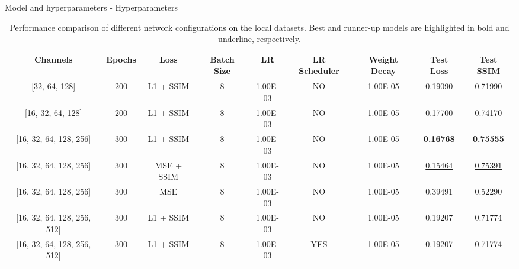\documentclass[8pt]{beamer}
\begin{document}
\begin{frame}{Model and hyperparameters - Hyperparameters}
    \begin{table}[ht]
        \centering
        \small
        \scriptsize
        \begin{tabular}{|c|c|c|c|c|c|c|c|c|}
        \hline
        \textbf{Channels} & \textbf{Epochs} & \textbf{Loss} & \textbf{Batch Size} & \textbf{LR} & \textbf{LR Scheduler} & \textbf{Weight Decay} & \textbf{Test Loss} & \textbf{Test SSIM} \\
        \hline
        {[}32, 64, 128{]} & 200 & L1 + SSIM & 8 & 1.00E-03 & NO & 1.00E-05 & 0.19090 & 0.71990 \\
        {[}16, 32, 64, 128{]} & 200 & L1 + SSIM & 8 & 1.00E-03 & NO & 1.00E-05 & 0.17700 & 0.74170 \\
        {[}16, 32, 64, 128, 256{]} & 300 & L1 + SSIM & 8 & 1.00E-03 & NO & 1.00E-05 & \textbf{0.16768} & \textbf{0.75555} \\
        {[}16, 32, 64, 128, 256{]} & 300 & MSE + SSIM & 8 & 1.00E-03 & NO & 1.00E-05 & \underline{0.15464} & \underline{0.75391} \\
        {[}16, 32, 64, 128, 256{]} & 300 & MSE & 8 & 1.00E-03 & NO & 1.00E-05 & 0.39491 & 0.52290 \\
        {[}16, 32, 64, 128, 256, 512{]} & 300 & L1 + SSIM & 8 & 1.00E-03 & NO & 1.00E-05 & 0.19207 & 0.71774 \\
        {[}16, 32, 64, 128, 256, 512{]} & 300 & L1 + SSIM & 8 & 1.00E-03 & YES & 1.00E-05 & 0.19207 & 0.71774 \\
        \hline
        \end{tabular}
        \caption{Performance comparison of different network configurations on the local datasets. Best and runner-up models are highlighted in bold and underline, respectively.}
    \end{table}
\end{frame}
\end{document}
